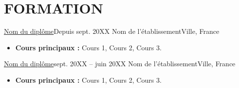 \section{FORMATION}
\resumeSubHeadingListStart

\resumeSubheading
  {\href{https://example.com}{Nom du diplôme}}{Depuis sept. 20XX}
  {Nom de l'établissement}{Ville, France}
  \begin{itemize}[leftmargin=0.12in, label={}, itemsep=0pt]
    \item \small \textbf{Cours principaux :} Cours 1, Cours 2, Cours 3.
  \end{itemize}

\vspace{-4pt}

\resumeSubheading
  {\href{https://example.com}{Nom du diplôme}}{sept. 20XX -- juin 20XX}
  {Nom de l'établissement}{Ville, France}
  \begin{itemize}[leftmargin=0.12in, label={}, itemsep=0pt]
    \item \small \textbf{Cours principaux :} Cours 1, Cours 2, Cours 3.
  \end{itemize}

\resumeSubHeadingListEnd
